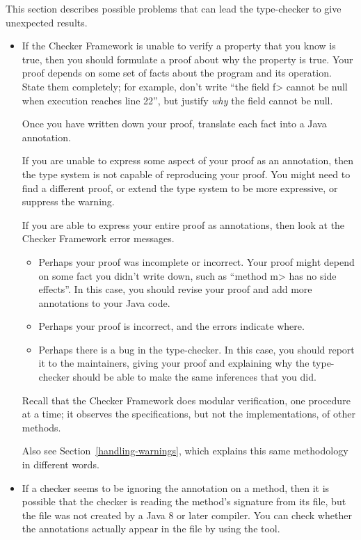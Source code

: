 
This section describes possible problems that can lead the type-checker to
give unexpected results.


\begin{itemize}
\item
  If the Checker Framework is unable to verify a property that you know is
  true, then you should formulate a proof about why the property is true.
  Your proof depends on some set of facts about the program and its
  operation.  State them completely; for example, don't write ``the field
  \<f> cannot be null when execution reaches line 22'', but justify
  \emph{why} the field cannot be null.

  Once you have written down your proof, translate each fact into a Java
  annotation.

  If you are unable to express some aspect of your proof as an annotation,
  then the type system is not capable of reproducing your proof.  You might
  need to find a different proof, or extend the type system to be more
  expressive, or suppress the warning.

  If you are able to express your entire proof as annotations, then look at
  the Checker Framework error messages.
  \begin{itemize}
  \item
    Perhaps your proof was incomplete or incorrect.  Your proof might
    depend on some fact you didn't write down, such as ``method
    \<m> has no side effects''.  In this case, you should revise your proof
    and add more annotations to your Java code.
  \item
    Perhaps your proof is incorrect, and the errors indicate where.
  \item
    Perhaps there is a bug in the type-checker.  In this case,
    you should report it to the maintainers, giving your proof and explaining
    why the type-checker should be able to make the same inferences that you did.
  \end{itemize}

  Recall that the Checker Framework does modular verification,
  one procedure at a time; it observes the specifications, but not the
  implementations, of other methods.

  Also see Section~\ref{handling-warnings}, which explains this same
  methodology in different words.

\item
If a checker seems to be ignoring the annotation on a method, then it is
possible that the checker is reading the method's signature from its
 file, but the  file was not created by a Java 8
or later compiler.
You can check whether the annotations actually appear in the
 file by using the  tool.


\end{itemize}

